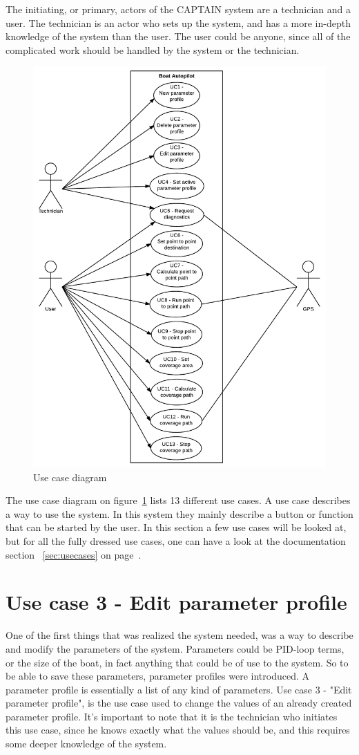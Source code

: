 The initiating, or primary, actors of the CAPTAIN system are a technician and a user. The technician is an actor who sets up the system, and has a more in-depth knowledge of the system than the user. The user could be anyone, since all of the complicated work should be handled by the system or the technician. 

\begin{figure}[h]
\centering
\includegraphics[width=0.7\linewidth]{../Appendix/Project/Dokumentation/Images/Requirements_specification/Usecase_diagram}
\caption{Use case diagram}
\label{fig:usecasediagram}
\end{figure}

The use case diagram on figure~\ref{fig:usecasediagram} lists 13 different use cases. A use case describes a way to use the system. In this system they mainly describe a button or function that can be started by the user. In this section a few use cases will be looked at, but for all the fully dressed use cases, one can have a look at the documentation section ~\ref{sec:usecases} on page~\pageref{sec:usecases}.

\section{Use case 3 - Edit parameter profile}
One of the first things that was realized the system needed, was a way to describe and modify the parameters of the system. Parameters could be PID-loop terms, or the size of the boat, in fact anything that could be of use to the system. So to be able to save these parameters, parameter profiles were introduced. A parameter profile is essentially a list of any kind of parameters. Use case 3 - "Edit parameter profile", is the use case used to change the values of an already created parameter profile. It's important to note that it is the technician who initiates this use case, since he knows exactly what the values should be, and this requires some deeper knowledge of the system. 

